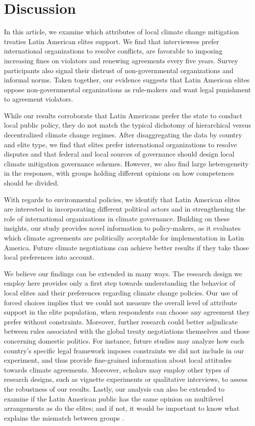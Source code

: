 \documentclass[a4paper,12pt]{article}
\begin{document}
\section{Discussion}%
\label{sec:discussion}

In this article, we examine which attributes of local climate change mitigation treaties Latin American elites support. We find that interviewees prefer international organizations to resolve conflicts, are favorable to imposing increasing fines on violators and renewing agreements every five years. Survey participants also signal their distrust of non-governmental organizations and informal norms. Taken together, our evidence suggests that Latin American elites oppose non-governmental organizations as rule-makers and want legal punishment to agreement violators.

While our results corroborate that Latin Americans prefer the state to conduct local public policy, they do not match the typical dichotomy of hierarchical versus decentralized climate change regimes. After disaggregating the data by country and elite type, we find that elites prefer international organizations to resolve disputes and that federal and local sources of governance should design local climate mitigation governance schemes. However, we also find large heterogeneity in the responses, with groups holding different opinions on how competences should be divided.

With regards to environmental policies, we identify that Latin American elites are interested in incorporating different political actors and in strengthening the role of international organizations in climate governance. Building on these insights, our study provides novel information to policy-makers, as it evaluates which climate agreements are politically acceptable for implementation in Latin America. Future climate negotiations can achieve better results if they take those local preferences into account.

We believe our findings can be extended in many ways. The research design we employ here provides only a first step towards understanding the behavior of local elites and their preferences regarding climate change policies. Our use of forced choices implies that we could not measure the overall level of attribute support in the elite population, when respondents can choose any agreement they prefer without constraints. Moreover, further research could better adjudicate between rules associated with the global treaty negotiations themselves and those concerning domestic politics. For instance, future studies may analyze how each country's specific legal framework imposes constraints we did not include in our experiment, and thus provide fine-grained information about local attitudes towards climate agreements. Moreover, scholars may employ other types of research designs, such as vignette experiments or qualitative interviews, to assess the robustness of our results. Lastly, our analysis can also be extended to examine if the Latin American public has the same opinion on multilevel arrangements as do the elites; and if not, it would be important to know what explains the mismatch between groups \citep{luna2005political}.
\end{document}

